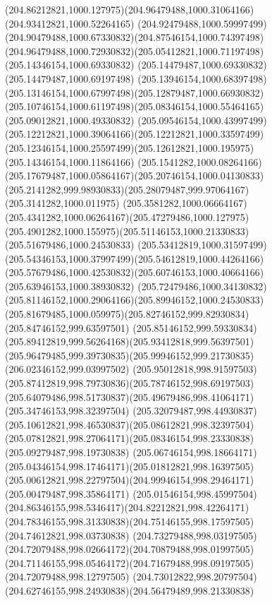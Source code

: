 {{\curveto(204.86212821,1000.127975)(204.96479488,1000.31064166)(204.93412821,1000.52264165)
\curveto(204.92479488,1000.59997499)(204.90479488,1000.67330832)(204.87546154,1000.74397498)
\curveto(204.96479488,1000.72930832)(205.05412821,1000.71197498)(205.14346154,1000.69330832)
\lineto(205.14479487,1000.69330832)
\lineto(205.14479487,1000.69197498)
\curveto(205.13946154,1000.68397498)(205.13146154,1000.67997498)(205.12879487,1000.66930832)
\curveto(205.10746154,1000.61197498)(205.08346154,1000.55464165)(205.09012821,1000.49330832)
\curveto(205.09546154,1000.43997499)(205.12212821,1000.39064166)(205.12212821,1000.33597499)
\curveto(205.12346154,1000.25597499)(205.12612821,1000.195975)(205.14346154,1000.11864166)
\curveto(205.1541282,1000.08264166)(205.17679487,1000.05864167)(205.20746154,1000.04130833)
\curveto(205.2141282,999.98930833)(205.28079487,999.97064167)(205.3141282,1000.011975)
\curveto(205.3581282,1000.06664167)(205.4341282,1000.06264167)(205.47279486,1000.127975)
\curveto(205.4901282,1000.155975)(205.51146153,1000.21330833)(205.51679486,1000.24530833)
\curveto(205.53412819,1000.31597499)(205.54346153,1000.37997499)(205.54612819,1000.44264166)
\curveto(205.57679486,1000.42530832)(205.60746153,1000.40664166)(205.63946153,1000.38930832)
\curveto(205.72479486,1000.34130832)(205.81146152,1000.29064166)(205.89946152,1000.24530833)
\curveto(205.81679485,1000.059975)(205.82746152,999.82930834)(205.84746152,999.63597501)
\curveto(205.85146152,999.59330834)(205.89412819,999.56264168)(205.93412818,999.56397501)
\curveto(205.96479485,999.39730835)(205.99946152,999.21730835)(206.02346152,999.03997502)
\curveto(205.95012818,998.91597503)(205.87412819,998.79730836)(205.78746152,998.69197503)
\curveto(205.64079486,998.51730837)(205.49679486,998.41064171)(205.34746153,998.32397504)
\curveto(205.32079487,998.44930837)(205.10612821,998.46530837)(205.08612821,998.32397504)
\curveto(205.07812821,998.27064171)(205.08346154,998.23330838)(205.09279487,998.19730838)
\curveto(205.06746154,998.18664171)(205.04346154,998.17464171)(205.01812821,998.16397505)
\curveto(205.00612821,998.22797504)(204.99946154,998.29464171)(205.00479487,998.35864171)
\curveto(205.01546154,998.45997504)(204.86346155,998.5346417)(204.82212821,998.42264171)
\curveto(204.78346155,998.31330838)(204.75146155,998.17597505)(204.74612821,998.03730838)
\curveto(204.73279488,998.03197505)(204.72079488,998.02664172)(204.70879488,998.01997505)
\curveto(204.71146155,998.05464172)(204.71679488,998.09197505)(204.72079488,998.12797505)
\curveto(204.73012822,998.20797504)(204.62746155,998.24930838)(204.56479489,998.21330838)
}}
